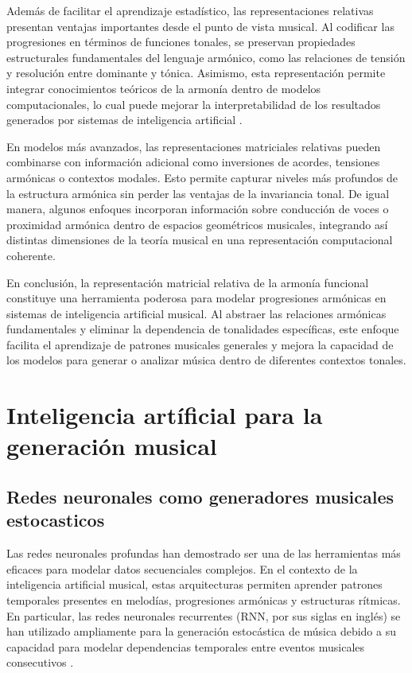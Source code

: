 \documentclass[12pt]{report}
\begin{document}
Además de facilitar el aprendizaje estadístico, las representaciones relativas presentan ventajas importantes desde el punto de vista musical. Al codificar las progresiones en términos de funciones tonales, se preservan propiedades estructurales fundamentales del lenguaje armónico, como las relaciones de tensión y resolución entre dominante y tónica. Asimismo, esta representación permite integrar conocimientos teóricos de la armonía dentro de modelos computacionales, lo cual puede mejorar la interpretabilidad de los resultados generados por sistemas de inteligencia artificial \cite{farbood2012quantifying}.

En modelos más avanzados, las representaciones matriciales relativas pueden combinarse con información adicional como inversiones de acordes, tensiones armónicas o contextos modales. Esto permite capturar niveles más profundos de la estructura armónica sin perder las ventajas de la invariancia tonal. De igual manera, algunos enfoques incorporan información sobre conducción de voces o proximidad armónica dentro de espacios geométricos musicales, integrando así distintas dimensiones de la teoría musical en una representación computacional coherente.

En conclusión, la representación matricial relativa de la armonía funcional constituye una herramienta poderosa para modelar progresiones armónicas en sistemas de inteligencia artificial musical. Al abstraer las relaciones armónicas fundamentales y eliminar la dependencia de tonalidades específicas, este enfoque facilita el aprendizaje de patrones musicales generales y mejora la capacidad de los modelos para generar o analizar música dentro de diferentes contextos tonales.


\section{Inteligencia artíficial para la generación musical}

\subsection{Redes neuronales como generadores musicales estocasticos}
Las redes neuronales profundas han demostrado ser una de las herramientas más eficaces para modelar datos secuenciales complejos. En el contexto de la inteligencia artificial musical, estas arquitecturas permiten aprender patrones temporales presentes en melodías, progresiones armónicas y estructuras rítmicas. En particular, las redes neuronales recurrentes (RNN, por sus siglas en inglés) se han utilizado ampliamente para la generación estocástica de música debido a su capacidad para modelar dependencias temporales entre eventos musicales consecutivos \cite{todd1989connectionist}.
\end{document}
